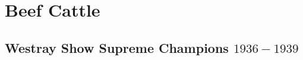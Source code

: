 \chapter{Beef Cattle}
\section[Supreme Champions]{Westray Show Supreme Champions $1936-1939$}
\small

\normalsize
